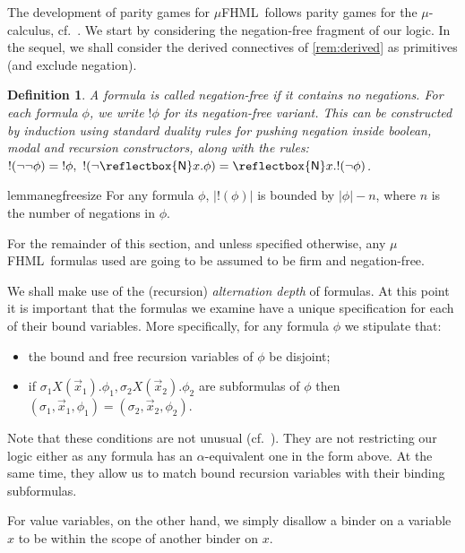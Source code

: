 \documentclass[10pt,a4paper]{article}
\newtheorem{definition}[theorem]{Definition}
\theoremstyle{definition}
\theoremstyle{remark}
\newcommand\new[0]{\reflectbox{\ensuremath{\mathsf{N}}}}
\newcommand\fresh[1]{\new #1.}
\newcommand\fhml[0]{$\mu$FHML}
\begin{document}
The development of parity games for \fhml\ follows
parity games for the $\mu$-calculus, cf.~\cite{EmersonJutla91}. We start by
considering the negation-free fragment of our logic. In the sequel, we shall consider the derived connectives of \cref{rem:derived} as primitives (and exclude negation).

\begin{definition}
  A formula is called \emph{negation-free}
  if it contains no negations. For each formula $\phi$, we
write $!\phi$ for its negation-free variant. This can be constructed by induction using standard duality rules for pushing negation inside boolean, modal and recursion constructors, along with the rules: \
$ !(\lnot\lnot\phi)={!\phi},\
        !(\lnot \fresh{x} \phi) = \fresh{x} !(\lnot \phi) 
$.
\end{definition}


\begin{restatable}{lemma}{negfreesize}\label{lem:negfreesize}
    For any formula $\phi$, $|!(\phi)|$ is bounded by $|\phi| - n$, where $n$ is the number of negations in $\phi$. 
\end{restatable}

For the remainder of this section, and unless specified otherwise, any \fhml\ formulas used are going to be assumed to be firm and negation-free.

We shall make use of the (recursion) \emph{alternation depth} of formulas. At this point it is important that the formulas we examine have a unique specification for each of their bound variables. More specifically, for any formula $\phi$ we stipulate that:
\begin{itemize}
\item the bound and free recursion variables of $\phi$ be disjoint;
\item if $\sigma_1 X(\vec x_1).\phi_1,\sigma_2 X(\vec x_2).\phi_2$ are subformulas of $\phi$ then $(\sigma_1,\vec x_1,\phi_1)=(\sigma_2,\vec x_2,\phi_2)$.
\end{itemize}
Note that these conditions are not unusual (cf.~\cite{KlinL17}). They are not restricting our logic either as any formula has an $\alpha$-equivalent one in the form above. At the same time, they allow us to match bound recursion variables with their binding subformulas.

For value variables, on the other hand, we simply disallow a binder on a variable $x$ to be within the scope of another binder on $x$.
\end{document}
